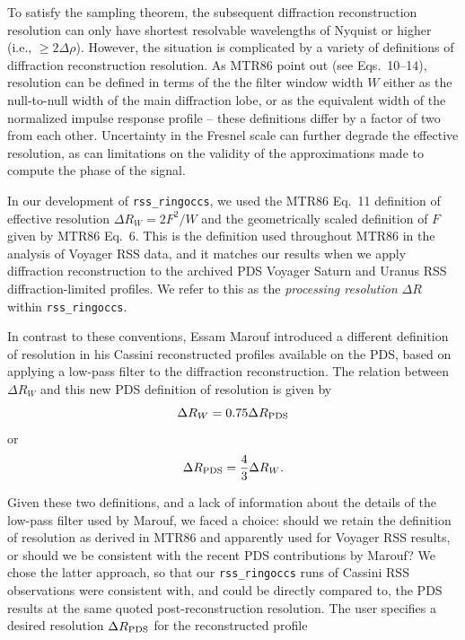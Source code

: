 \documentclass[titlepage, 12pt]{article}
\begin{document}
        \par\hfill\par
        To satisfy the sampling 
        theorem, the subsequent diffraction reconstruction resolution can only 
        have shortest resolvable wavelengths of Nyquist or higher (i.e., 
        $\ge2\Delta\rho$). However, the situation is complicated by a variety of definitions of diffraction reconstruction resolution. As MTR86 point out (see Eqs.~10--14), resolution can be defined in terms of the the filter window width $W$ either as the null-to-null width of the main diffraction lobe, or as the equivalent width of the normalized impulse response profile -- these definitions differ by a factor of two from each other. Uncertainty in the Fresnel scale can further degrade the effective resolution, as can limitations on the validity of the approximations made to compute the phase of the signal. 
         \par\hfill\par
        In our development of \texttt{rss\_ringoccs}, we used the MTR86 Eq.~11 definition of effective resolution $\Delta R_W=2F^2/W$ and the geometrically scaled definition of $F$ given by MTR86 Eq.~6. This is the definition used throughout MTR86 in the analysis of Voyager RSS data, and it matches our results when we apply diffraction reconstruction to the archived PDS Voyager Saturn and Uranus RSS diffraction-limited profiles. We refer to this as the \textit{processing resolution} $\Delta R$ within \texttt{rss\_ringoccs}.
        \par\hfill\par
        In contrast to these conventions, Essam Marouf introduced a different definition of resolution in his Cassini reconstructed profiles available on the PDS, based on applying a low-pass filter to the diffraction reconstruction. The relation between $\Delta R_W$  and this new PDS definition of resolution is given by
        $$\Delta R_W = 0.75 \Delta R_{\rm PDS}$$
        or
        $$\Delta R_{\rm PDS} = \frac{4}{3} \Delta R_W.$$
           \par\hfill\par
        Given these two definitions, and a lack of information about the details of the low-pass filter used by Marouf, we faced a choice: should we retain the definition of resolution as derived in MTR86 and apparently used for Voyager RSS results, or should we be consistent with the recent PDS contributions by Marouf? We chose the latter approach, so that our \texttt{rss\_ringoccs} runs of Cassini RSS observations were consistent with, and could be directly compared to, the PDS results at the same quoted post-reconstruction resolution. The user specifies a desired resolution $\Delta R_{\rm PDS}$ for the reconstructed profile
\end{document}
